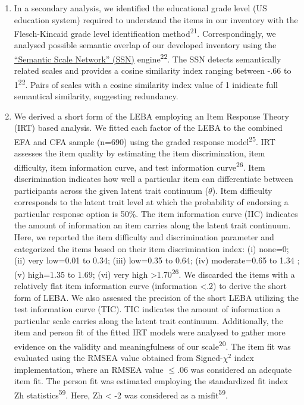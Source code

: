 \documentclass[
  man]{apa6}
\begin{document}
\begin{enumerate}
\def\labelenumi{(\arabic{enumi})}
\setcounter{enumi}{3}
\item
  In a secondary analysis, we identified the educational grade level (US education system) required to understand the items in our inventory with the Flesch-Kincaid grade level identification method\textsuperscript{21}. Correspondingly, we analysed possible semantic overlap of our developed inventory using the \href{https://rosenbusch.shinyapps.io/semantic_net/}{``Semantic Scale Network'' (SSN)} engine\textsuperscript{22}. The SSN detects semantically related scales and provides a cosine similarity index ranging between -.66 to 1\textsuperscript{22}. Pairs of scales with a cosine similarity index value of 1 inidicate full semantical similarity, suggesting redundancy.
\item
  We derived a short form of the LEBA employing an Item Response Theory (IRT) based analysis. We fitted each factor of the LEBA to the combined EFA and CFA sample (n=690) using the graded response model\textsuperscript{25}. IRT assesses the item quality by estimating the item discrimination, item difficulty, item information curve, and test information curve\textsuperscript{26}. Item discrimination indicates how well a particular item can differentiate between participants across the given latent trait continuum (\(\theta\)). Item difficulty corresponds to the latent trait level at which the probability of endorsing a particular response option is 50\%. The item information curve (IIC) indicates the amount of information an item carries along the latent trait continuum. Here, we reported the item difficulty and discrimination parameter and categorized the items based on their item discrimination index: (i) none=0; (ii) very low=0.01 to 0.34; (iii) low=0.35 to 0.64; (iv) moderate=0.65 to 1.34 ; (v) high=1.35 to 1.69; (vi) very high \textgreater1.70\textsuperscript{26}. We discarded the items with a relatively flat item information curve (information \textless.2) to derive the short form of LEBA. We also assessed the precision of the short LEBA utilizing the test information curve (TIC). TIC indicates the amount of information a particular scale carries along the latent trait continuum. Additionally, the item and person fit of the fitted IRT models were analysed to gather more evidence on the validity and meaningfulness of our scale\textsuperscript{20}. The item fit was evaluated using the RMSEA value obtained from Signed-\(\chi^2\) index implementation, where an RMSEA value \(\le\).06 was considered an adequate item fit. The person fit was estimated employing the standardized fit index Zh statistics\textsuperscript{59}. Here, Zh \textless{} -2 was considered as a misfit\textsuperscript{59}.
\end{enumerate}
\end{document}
